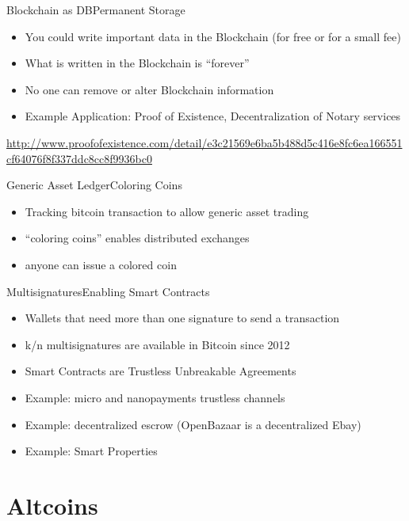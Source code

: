\documentclass[english,compress]{beamer}
\begin{document}
\begin{frame}{Blockchain as DB}{Permanent Storage}
\begin{itemize}
 \item You could write important data in the Blockchain (for free or for a small fee)
 \item What is written in the Blockchain is ``forever''
 \item No one can remove or alter Blockchain information
 \item Example Application: Proof of Existence, Decentralization of Notary services 
\end{itemize}
 
\begin{tiny}
 \url{http://www.proofofexistence.com/detail/e3c21569e6ba5b488d5c416e8fc6ea166551cf64076f8f337ddc8cc8f9936bc0}
\end{tiny}
\end{frame}

\begin{frame}{Generic Asset Ledger}{Coloring Coins}
\begin{itemize}
\item Tracking bitcoin transaction to allow generic asset trading
\item ``coloring coins'' enables distributed exchanges
\item anyone can issue a colored coin
\end{itemize}
\vfill
{}
\end{frame}


\begin{frame}{Multisignatures}{Enabling Smart Contracts}
\begin{itemize}
\item Wallets that need more than one signature to send a transaction
\item k/n multisignatures are available in Bitcoin since 2012
\item Smart Contracts are Trustless Unbreakable Agreements
\item Example: micro and nanopayments trustless channels
\item Example: decentralized escrow (OpenBazaar is a decentralized Ebay)
\item Example: Smart Properties
\end{itemize}

\end{frame}

\section{Altcoins}
\end{document}

